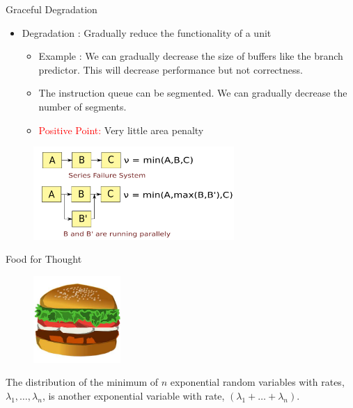 \documentclass[xcolor=pdftex,dvipsnames,table,svgnames,x11names]{beamer}
\begin{document}
\begin{frame} {Graceful Degradation}
\begin{itemize}
  \item Degradation : Gradually reduce the functionality of a unit 
    \begin{itemize}
      \item Example : We can gradually decrease the size of buffers like the branch predictor. This will decrease
	    performance but not correctness.
      \item The instruction queue can be segmented. We can gradually decrease the number of segments.
      \item \textcolor{red}{Positive Point: } Very little area penalty
    \end{itemize}
 \end{itemize}

\begin{center}
\begin{figure}[h]
 \includegraphics[width=3in]{map2}
\end{figure}
\end{center}

\end{frame}

\begin{frame}{Food for Thought}
\begin{center}
  \begin{figure}[h]
    \includegraphics[width=1.3in]{burger}
 \end{figure}
 \end{center}
\vspace{-6mm}
 \begin{theorem}
  The distribution of the minimum of $n$ exponential random variables with rates, $\lambda_1, \ldots, \lambda_n$, is 
another exponential variable with rate, $(\lambda_1 + \ldots + \lambda_n)$. 
 \end{theorem}

\end{frame}
\end{document}

